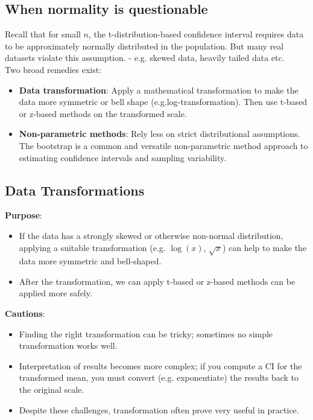 \documentclass[10pt, total={6in, 8in}]{extarticle}
\begin{document}
\subsection{When normality is questionable}
Recall that for small $n$, the t-distribution-based confidence interval requires data to be approximately normally distributed in the population. But many real datasets violate this assumption. - e.g. skewed data, heavily tailed data etc. \\[2ex]
\noindent Two broad remedies exist:
\begin{itemize}
    \item \textbf{Data transformation}: Apply a mathematical transformation to make the data more symmetric or bell shape (e.g.log-transformation). Then use t-based or z-based methods on the transformed scale.
    \item \textbf{Non-parametric methods}: Rely less on strict distributional assumptions. The bootstrap is a common and versatile non-parametric method approach to estimating confidence intervals and sampling variability.
\end{itemize}

\subsection{Data Transformations}
\textbf{Purpose}:
\begin{itemize}
    \item If the data has a strongly skewed or otherwise non-normal distribution, applying a suitable transformation (e.g. $\log(x)$, $\sqrt{x}$) can help to make the data more symmetric and bell-shaped.
    \item After the transformation, we can apply t-based or z-based methods can be applied more safely.
\end{itemize}
\textbf{Cautions}:
\begin{itemize}
    \item Finding the right transformation can be tricky; sometimes no simple transformation works well.
    \item Interpretation of results becomes more complex; if you compute a CI for the transformed mean, you must convert (e.g. exponentiate) the results back to the original scale.
    \item Despite these challenges, transformation often prove very useful in practice.
\end{itemize}
\end{document}
